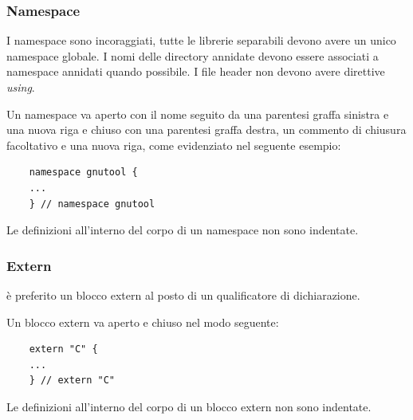 \documentclass[../NomeDocumento.tex]{subfiles}
\begin{document}
	\subsubsection*{Namespace} 
	I namespace sono incoraggiati, tutte le librerie separabili devono avere un unico namespace globale. I nomi delle directory annidate devono essere associati a namespace annidati quando possibile. I file header non devono avere direttive \textit{using}.
	
	\noindent Un namespace va aperto con il nome seguito da una parentesi graffa sinistra e una nuova riga e chiuso con una parentesi graffa destra, un commento di chiusura facoltativo e una nuova riga, come evidenziato nel seguente esempio:
	
	\begin{verbatim}
	namespace gnutool {
	...
	} // namespace gnutool
	\end{verbatim}
	
	\noindent Le definizioni all'interno del corpo di un namespace non sono indentate.
	
	\subsubsection*{Extern} è preferito un blocco extern al posto di un qualificatore di dichiarazione.
	
	\noindent Un blocco extern va aperto e chiuso nel modo seguente:
	
	\begin{verbatim}
	extern "C" {
	...
	} // extern "C"
	\end{verbatim}
	
	\noindent Le definizioni all'interno del corpo di un blocco extern non sono indentate.
\end{document}
